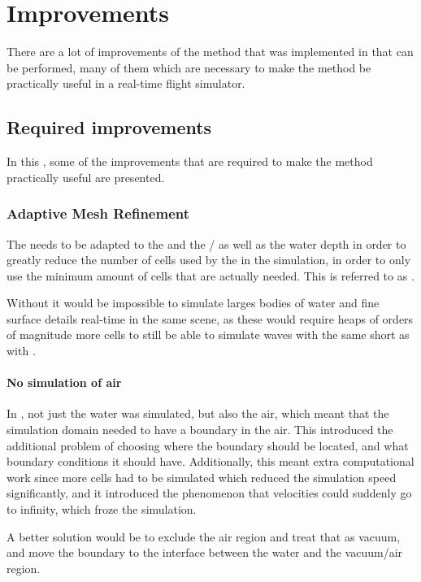 \chapter{Improvements}

There are a lot of improvements of the method that was implemented in \thisprojectwork that can be performed, many of them which are necessary  to make the method be practically useful in a real-time flight simulator.

\section{Required improvements}

In this \levelname, some of the improvements that are required to make the method practically useful are presented.

\subsection{Adaptive Mesh Refinement}

The \LOD needs to be adapted to the  and the \FOV/ as well as the water depth in order to greatly reduce the number of cells used by the \FVM in the simulation, in order to only use the minimum amount of cells that are actually needed. This is referred to as \AMR.

Without \AMR it would be impossible to simulate larges bodies of water and fine surface details real-time in the same scene, as these would require heaps of orders of magnitude more cells to still be able to simulate waves with the same short \wavelength as with \AMR.

\subsubsection{No simulation of air} In \thisprojectwork, not just the water was simulated, but also the air, which meant that the simulation domain needed to have a boundary in the air. This introduced the additional problem of choosing where the boundary should be located, and what boundary conditions it should have. Additionally, this meant extra computational work since more cells had to be simulated which reduced the simulation speed significantly, and it introduced the phenomenon that velocities could suddenly go to infinity, which froze the simulation.

A better solution would be to exclude the air region and treat that as vacuum, and move the boundary to the interface between the water and the vacuum/air region.

